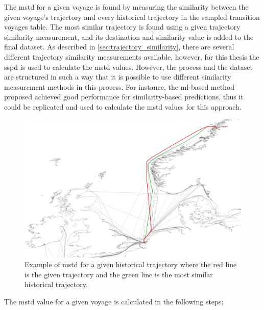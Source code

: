 The \acrshort{mstd} for a given voyage is found by measuring the similarity between the given voyage's trajectory and every historical trajectory in the sampled transition voyages table. The most similar trajectory is found using a given trajectory similarity measurement, and its destination and similarity value is added to the final dataset. As described in \cref{sec:trajectory_similarity}, there are several different trajectory similarity measurements available, however, for this thesis the \acrfull{sspd} is used to calculate the \acrshort{mstd} values. However, the process and the dataset are structured in such a way that it is possible to use different similarity measurement methods in this process. For instance, the \acrshort{ml}-based method proposed \cite{Zhang2020AISApproach} achieved good performance for similarity-based predictions, thus it could be replicated and used to calculate the \acrshort{mstd} values for this approach.

\begin{figure}[htbp]  %
    \centering
    \includegraphics[width=1.0\textwidth]{figures/mstd}
    \caption{Example of \acrshort{mstd} for a given historical trajectory where the red line is the given trajectory and the green line is the most similar historical trajectory.}
    \label{fig:mstd}
\end{figure}

The \acrshort{mstd} value for a given voyage is calculated in the following steps:

